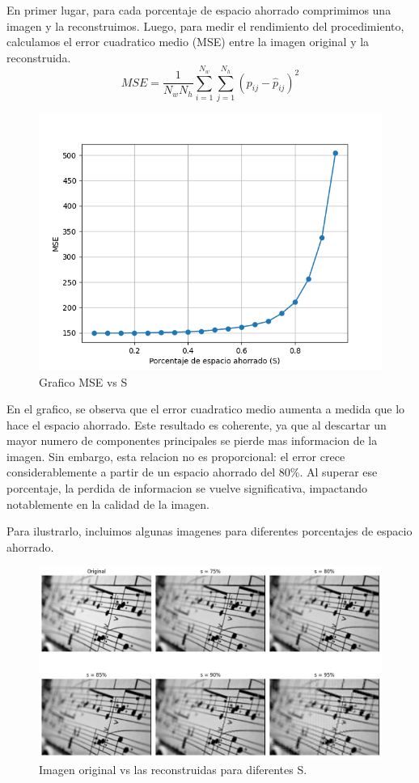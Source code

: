 \documentclass[a4paper,12pt]{article}
\numberwithin{equation}{section}
\numberwithin{figure}{section}
\begin{document}
En primer lugar, para cada porcentaje de espacio ahorrado comprimimos una imagen y la reconstruimos. Luego, para 
medir el rendimiento del procedimiento, calculamos el error cuadratico medio (MSE) entre la imagen original y 
la reconstruida. 
\begin{equation}
MSE = \frac{1}{N_w N_h} \sum_{i=1}^{N_w} \sum_{j=1}^{N_h} (p_{ij} - \hat{p}_{ij})^2
\end{equation}

\begin{figure}[H]
    \centering
    \includegraphics[width=1\textwidth]{Ejercicio 4a.png}
    \caption{Grafico MSE vs S}
    \label{fig:ej4}
\end{figure}

En el grafico, se observa que el error cuadratico medio aumenta a medida que lo hace el espacio ahorrado.
Este resultado es coherente, ya que al descartar un mayor numero de componentes principales se pierde mas 
informacion de la imagen. 
Sin embargo, esta relacion no es proporcional: el error crece considerablemente a partir de un espacio 
ahorrado del 80\%. Al superar ese porcentaje, la perdida de informacion se vuelve significativa, 
impactando notablemente en la calidad de la imagen. 


Para ilustrarlo, incluimos algunas imagenes para diferentes porcentajes de espacio ahorrado. 
\begin{figure}[H]
    \centering
    \includegraphics[width=1\textwidth]{Ejercicio 4b.png}
    \caption{Imagen original vs las reconstruidas para diferentes S.}
    \label{fig:ej4b}
\end{figure}
\end{document}
